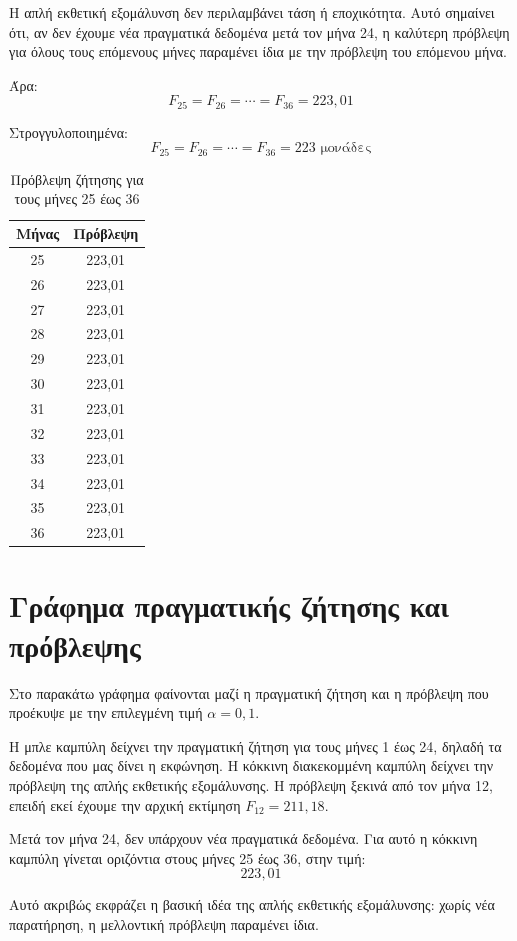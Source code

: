 \documentclass[12pt,a4paper]{article}
\begin{document}
Η απλή εκθετική εξομάλυνση δεν περιλαμβάνει τάση ή εποχικότητα. Αυτό σημαίνει ότι, αν δεν έχουμε νέα πραγματικά δεδομένα μετά τον μήνα 24, η καλύτερη πρόβλεψη για όλους τους επόμενους μήνες παραμένει ίδια με την πρόβλεψη του επόμενου μήνα.

Άρα:
\[
F_{25}=F_{26}=\cdots=F_{36}=223{,}01
\]

Στρογγυλοποιημένα:
\[
\boxed{F_{25}=F_{26}=\cdots=F_{36}=223 \text{ μονάδες}}
\]

\begin{table}[H]
\centering
\caption{Πρόβλεψη ζήτησης για τους μήνες 25 έως 36}
\begin{tabular}{cc}
\toprule
\textbf{Μήνας} & \textbf{Πρόβλεψη} \\
\midrule
25 & 223,01 \\
26 & 223,01 \\
27 & 223,01 \\
28 & 223,01 \\
29 & 223,01 \\
30 & 223,01 \\
31 & 223,01 \\
32 & 223,01 \\
33 & 223,01 \\
34 & 223,01 \\
35 & 223,01 \\
36 & 223,01 \\
\bottomrule
\end{tabular}
\end{table}

\section{Γράφημα πραγματικής ζήτησης και πρόβλεψης}

Στο παρακάτω γράφημα φαίνονται μαζί η πραγματική ζήτηση και η πρόβλεψη που προέκυψε με την επιλεγμένη τιμή \(\alpha=0{,}1\).

Η μπλε καμπύλη δείχνει την πραγματική ζήτηση για τους μήνες 1 έως 24, δηλαδή τα δεδομένα που μας δίνει η εκφώνηση. Η κόκκινη διακεκομμένη καμπύλη δείχνει την πρόβλεψη της απλής εκθετικής εξομάλυνσης. Η πρόβλεψη ξεκινά από τον μήνα 12, επειδή εκεί έχουμε την αρχική εκτίμηση \(F_{12}=211{,}18\).

Μετά τον μήνα 24, δεν υπάρχουν νέα πραγματικά δεδομένα. Για αυτό η κόκκινη καμπύλη γίνεται οριζόντια στους μήνες 25 έως 36, στην τιμή:
\[
223{,}01
\]

Αυτό ακριβώς εκφράζει η βασική ιδέα της απλής εκθετικής εξομάλυνσης: χωρίς νέα παρατήρηση, η μελλοντική πρόβλεψη παραμένει ίδια.
\end{document}
